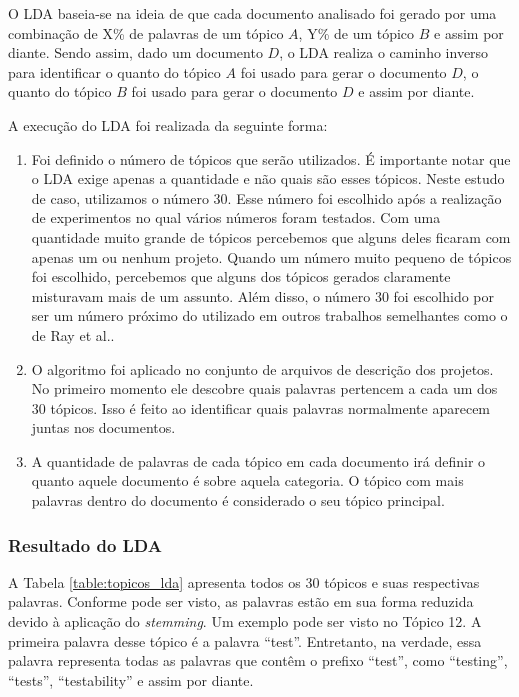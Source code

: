 O LDA baseia-se na ideia de que cada documento analisado foi gerado por uma combinação de  X\% de palavras de um tópico $A$, Y\% de um tópico $B$ e assim por diante. Sendo assim, dado um documento $D$, o LDA realiza o caminho inverso  para identificar o quanto do tópico $A$ foi usado para gerar o documento $D$, o quanto do tópico $B$ foi usado para gerar o documento $D$ e assim por diante. 


A execução do LDA foi realizada da seguinte forma:

\begin{enumerate}
\item Foi definido o número de tópicos que serão utilizados. É importante notar que o LDA exige apenas a quantidade e não quais são esses tópicos. Neste estudo de caso, utilizamos o número 30. Esse número foi escolhido após a realização de experimentos no qual vários números foram testados. Com uma quantidade muito grande de tópicos percebemos que alguns deles ficaram com apenas um ou nenhum projeto. Quando um número muito pequeno de tópicos foi escolhido, percebemos que alguns dos tópicos gerados claramente misturavam mais de um assunto. Além disso, o número 30 foi escolhido por ser um número próximo do utilizado em outros trabalhos semelhantes como o de Ray et al.\cite{ray2014large}. 
\item O algoritmo foi aplicado no conjunto de arquivos de descrição dos projetos. No primeiro momento ele descobre quais palavras pertencem a cada um dos 30 tópicos. Isso é feito ao identificar quais palavras normalmente aparecem juntas nos documentos.
\item A quantidade de palavras de cada tópico em cada documento irá  definir o quanto aquele documento é sobre aquela categoria. O tópico com mais palavras dentro do documento é considerado o seu tópico principal.
\end{enumerate}









\subsubsection{Resultado do LDA}

A Tabela \ref{table:topicos_lda} apresenta todos os 30 tópicos e suas respectivas palavras. Conforme pode ser visto, as palavras estão em sua forma reduzida devido à aplicação do \textit{stemming}. Um exemplo pode ser visto no Tópico 12. A primeira palavra desse tópico é a palavra ``test''. Entretanto, na verdade, essa palavra representa todas as palavras que contêm o prefixo ``test'', como ``testing'', ``tests'', ``testability'' e assim por diante. 

